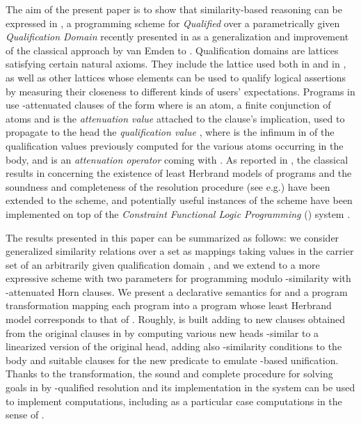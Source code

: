 \documentclass{sigplanconf}
\theoremstyle{definition}
\theoremstyle{plain}
\begin{document}
The aim of the present paper is to show that similarity-based reasoning can be expressed in , a programming scheme for {\em Qualified}  over a parametrically given {\em Qualification Domain}  recently presented in \cite{RR08} as a generalization and improvement of the classical approach by van Emden \cite{VE86} to  . Qualification domains are lattices satisfying certain natural axioms. They include the lattice  used both in \cite{VE86} and in \cite{Ses02}, as well as other lattices whose elements can be used to qualify logical
assertions by measuring their closeness to different kinds of users' expectations. Programs in  use -attenuated clauses of the form  where  is an atom,  a finite conjunction of atoms and  is the {\em attenuation value} attached to the clause's implication, used to propagate to the head the {\em qualification value} , where  is the infimum in  of the qualification values  previously computed for the various atoms occurring in the body, and   is an {\em attenuation operator} coming
with . As reported in \cite{RR08,RR08TR}, the classical results in  concerning the existence of least Herbrand models of programs and the soundness and completeness of the   resolution procedure (see e.g.\cite{VEK76,AVE82,Apt90}) have been extended to the  scheme, and potentially useful instances of the scheme have been implemented on top of the {\em Constraint Functional Logic Programming} () system  \cite{toy}.

The results presented in this paper can be summarized as follows: we consider generalized similarity relations over a set  as mappings  taking values in the carrier set  of an arbitrarily  given qualification domain , and we  extend  to a more expressive scheme  with two parameters for programming modulo -similarity with -attenuated Horn clauses. We present a declarative semantics for  and a program transformation mapping each  program  into a
 program  whose least Herbrand model corresponds to that of . Roughly,  is built adding to  new clauses obtained from the original clauses in  by computing various new heads -similar to a linearized version of the original head, adding also -similarity conditions   to the body and suitable clauses for  the  new predicate  to
emulate -based unification. Thanks to the  transformation, the sound and complete procedure for solving goals in  by -qualified  resolution and its implementation in the  system \cite{RR08} can be used to implement  computations, including as a particular case  computations in the sense of \cite{Ses02}.
\end{document}
